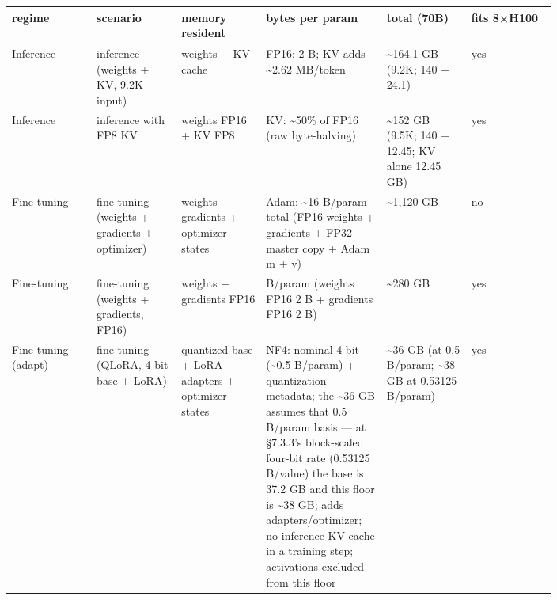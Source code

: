\nopagebreak[4]
\begin{longtable}[]{@{}
  >{\raggedright\arraybackslash}p{0.1327\linewidth}
  >{\raggedright\arraybackslash}p{0.1327\linewidth}
  >{\raggedright\arraybackslash}p{0.1327\linewidth}
  >{\raggedright\arraybackslash}p{0.1327\linewidth}
  >{\raggedright\arraybackslash}p{0.1327\linewidth}
  >{\raggedright\arraybackslash}p{0.1327\linewidth}@{}}
\toprule\noalign{}
\begin{minipage}[b]{\linewidth}\raggedright
regime
\end{minipage} & \begin{minipage}[b]{\linewidth}\raggedright
scenario
\end{minipage} & \begin{minipage}[b]{\linewidth}\raggedright
memory resident
\end{minipage} & \begin{minipage}[b]{\linewidth}\raggedright
bytes per param
\end{minipage} & \begin{minipage}[b]{\linewidth}\raggedright
total (70B)
\end{minipage} & \begin{minipage}[b]{\linewidth}\raggedright
fits 8×H100
\end{minipage} \\
\midrule\noalign{}
\endhead
\bottomrule\noalign{}
\endlastfoot
Inference & inference (weights + KV, 9.2K input) & weights + KV cache &
FP16: 2 B; KV adds \textasciitilde2.62 MB/token & \textasciitilde164.1
GB (9.2K; 140 + 24.1) & yes \\
\noalign{\label{tab:7.2}}
Inference & inference with FP8 KV & weights FP16 + KV FP8 & KV:
\textasciitilde50\% of FP16 (raw byte-halving) & \textasciitilde152 GB
(9.5K; 140 + 12.45; KV alone 12.45 GB) & yes \\
Fine-tuning & fine-tuning (weights + gradients + optimizer) & weights +
gradients + optimizer states & Adam: \textasciitilde16 B/param total
(FP16 weights + gradients + FP32 master copy + Adam m + v) &
\textasciitilde1,120 GB & no \\
Fine-tuning & fine-tuning (weights + gradients, FP16) & weights +
gradients FP16 & 4 B/param (weights FP16 2 B + gradients FP16 2 B) &
\textasciitilde280 GB & yes \\
Fine-tuning (adapt) & fine-tuning (QLoRA, 4-bit base + LoRA) & quantized
base + LoRA adapters + optimizer states & NF4: nominal 4-bit
(\textasciitilde0.5 B/param) + quantization metadata; the
\textasciitilde36 GB assumes that 0.5 B/param basis --- at §7.3.3's
block-scaled four-bit rate (0.53125 B/value) the base is 37.2 GB and
this floor is \textasciitilde38 GB; adds adapters/optimizer; no
inference KV cache in a training step; activations excluded from this
floor & \textasciitilde36 GB (at 0.5 B/param; \textasciitilde38 GB at
0.53125 B/param) & yes \\
\end{longtable}

